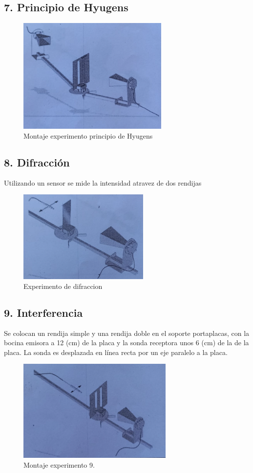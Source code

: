 \documentclass[a4paper,twocolumn,10pt]{article}
\begin{document}
\subsection*{7. Principio de Hyugens}
\begin{figure}[H]
    \centering
    \includegraphics[scale=.7]{MO_montaje/7.png}
    \caption{Montaje experimento principio de Hyugens}
    \label{fig:hyu}
\end{figure}

\subsection*{8. Difracción}
Utilizando un sensor se mide la intensidad atravez de dos rendijas
\begin{figure}[H]
    \centering
    \includegraphics{MO_montaje/8.png}
    \caption{Experimento de difraccion}
    \label{fig:montdif}
\end{figure}

\subsection*{9. Interferencia}
Se colocan un rendija simple y una rendija doble en el soporte portaplacas, con la bocina emisora a 12 (cm) de la placa y la sonda receptora unos 6 (cm) de la de la placa. La sonda es desplazada en línea recta por un eje paralelo a la placa.
\begin{figure}[H]
    \centering
    \includegraphics[scale=.7]{MO_montaje/9.png}
    \caption{Montaje experimento 9.}
    \label{fig:montinter}
\end{figure}
\end{document}
